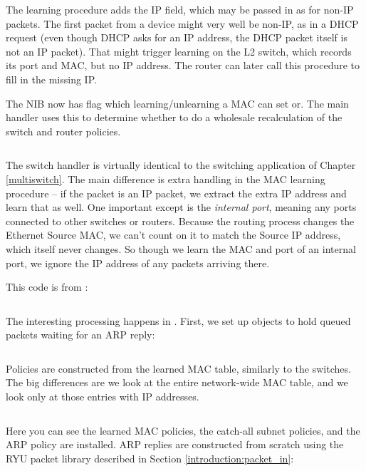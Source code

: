 \inputminted[firstline=56,lastline=87]{python}{code/routing/network_information_base.py} 

The learning procedure adds the IP field, which may be passed in as 
for non-IP packets.  The first packet from a device might very well be non-IP, as in a DHCP 
request (even though DHCP asks for an IP address, the DHCP packet itself is not an IP packet).
That might trigger learning on the L2 switch, which records its port and MAC, but no IP address.  
The router can later call this procedure to fill in the missing IP.  

The NIB now has  flag
which learning/unlearning a MAC can set or.  The main handler uses this to determine whether to do 
a wholesale recalculation of the switch and router policies.

\inputminted[firstline=186]{python}{code/routing/network_information_base.py} 

The switch handler is virtually identical to the switching application of Chapter \ref{multiswitch}.  
The main difference is extra handling in the MAC learning procedure -- if the packet is an
IP packet, we extract the extra IP address and learn that as well.  One important except is the 
\emph{internal port}, meaning any ports connected to other switches or routers.  Because the 
routing process changes the Ethernet Source MAC, we can't count on it to match the Source IP address,
which itself never changes.  So though we learn the MAC and port of an internal port, we ignore the
IP address of any packets arriving there.  

This code is from :

\inputminted[firstline=33]{python}{code/routing/switch_handler.py}

The interesting processing happens in . First, we set up 
objects to hold queued packets waiting for an ARP reply:

\inputminted[firstline=8,lastline=12]{python}{code/routing/router_handler.py} 

Policies are constructed from the learned MAC table, similarly to the switches.  The big differences
are we look at the entire network-wide MAC table, and we look only at those entries with IP 
addresses.

\inputminted[firstline=27,lastline=55]{python}{code/routing/router_handler.py} 

Here you can see the learned MAC policies, the catch-all subnet policies, and the ARP policy are 
installed.  ARP replies are constructed from scratch using the RYU packet library described in
Section \ref{introduction:packet_in}:

